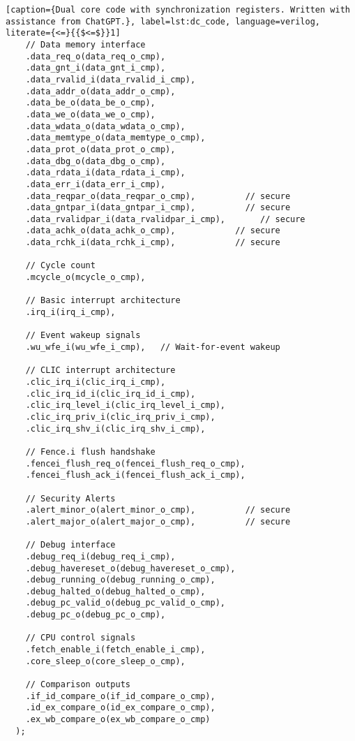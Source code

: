 \begin{lstlisting}[caption={Dual core code with synchronization registers. Written with assistance from ChatGPT.}, label=lst:dc_code, language=verilog, literate={<=}{{$<=$}}1]
    // Data memory interface
    .data_req_o(data_req_o_cmp),
    .data_gnt_i(data_gnt_i_cmp),
    .data_rvalid_i(data_rvalid_i_cmp),
    .data_addr_o(data_addr_o_cmp),
    .data_be_o(data_be_o_cmp),
    .data_we_o(data_we_o_cmp),
    .data_wdata_o(data_wdata_o_cmp),
    .data_memtype_o(data_memtype_o_cmp),
    .data_prot_o(data_prot_o_cmp),
    .data_dbg_o(data_dbg_o_cmp),
    .data_rdata_i(data_rdata_i_cmp),
    .data_err_i(data_err_i_cmp),
    .data_reqpar_o(data_reqpar_o_cmp),          // secure
    .data_gntpar_i(data_gntpar_i_cmp),          // secure
    .data_rvalidpar_i(data_rvalidpar_i_cmp),       // secure
    .data_achk_o(data_achk_o_cmp),            // secure
    .data_rchk_i(data_rchk_i_cmp),            // secure

    // Cycle count
    .mcycle_o(mcycle_o_cmp),

    // Basic interrupt architecture
    .irq_i(irq_i_cmp),

    // Event wakeup signals
    .wu_wfe_i(wu_wfe_i_cmp),   // Wait-for-event wakeup

    // CLIC interrupt architecture
    .clic_irq_i(clic_irq_i_cmp),
    .clic_irq_id_i(clic_irq_id_i_cmp),
    .clic_irq_level_i(clic_irq_level_i_cmp),
    .clic_irq_priv_i(clic_irq_priv_i_cmp),
    .clic_irq_shv_i(clic_irq_shv_i_cmp),

    // Fence.i flush handshake
    .fencei_flush_req_o(fencei_flush_req_o_cmp),
    .fencei_flush_ack_i(fencei_flush_ack_i_cmp),

    // Security Alerts
    .alert_minor_o(alert_minor_o_cmp),          // secure
    .alert_major_o(alert_major_o_cmp),          // secure

    // Debug interface
    .debug_req_i(debug_req_i_cmp),
    .debug_havereset_o(debug_havereset_o_cmp),
    .debug_running_o(debug_running_o_cmp),
    .debug_halted_o(debug_halted_o_cmp),
    .debug_pc_valid_o(debug_pc_valid_o_cmp),
    .debug_pc_o(debug_pc_o_cmp),

    // CPU control signals
    .fetch_enable_i(fetch_enable_i_cmp),
    .core_sleep_o(core_sleep_o_cmp),

    // Comparison outputs
    .if_id_compare_o(if_id_compare_o_cmp),
    .id_ex_compare_o(id_ex_compare_o_cmp),
    .ex_wb_compare_o(ex_wb_compare_o_cmp)
  );

\end{lstlisting}

